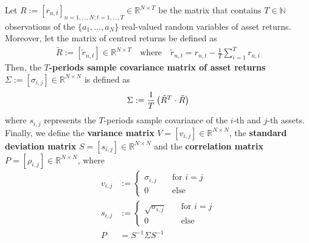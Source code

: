     \begin{definition}\label{definition:CovarianceMatrix}
           Let $R := [r_{n,t}]_{n = 1, \dots, N; t = 1, \dots, T} \in \mathbb{R}^{N \times T}$ be the matrix that contains $T \in \mathbb{N}$ observations of the $\{ a_1, \dots, a_N \}$ real-valued random variables of asset returns. Moreover, let the matrix of centred returns be defined as
           \begin{align*}
               \tilde{R} := [\tilde{r}_{n,t}] \in \mathbb{R}^{N \times T} \quad \text{where} \quad \tilde{r}_{n,t} = r_{n,t} - \frac{1}{T} \sum_{i=1}^T r_{n,i}
           \end{align*}
           Then, the \textbf{$T$-periods sample covariance matrix of asset returns} $\Sigma := [\sigma_{i,j}] \in \mathbb{R}^{N \times N}$ is defined as
           \begin{align*}
               \Sigma := \frac{1}{T} \left( \Tilde{R}^T \cdot \Tilde{R} \right)
           \end{align*}
           where $s_{i,j}$ represents the $T$-periods sample covariance of the $i$-th and $j$-th assets. Finally, we define the \textbf{variance matrix} $V = [v_{i,j}] \in \mathbb{R}^{N \times N}$, the \textbf{standard deviation matrix} $S = [s_{i,j}] \in \mathbb{R}^{N \times N}$ and the \textbf{correlation matrix} $P = [\rho_{i,j}] \in \mathbb{R}^{N \times N}$, where
           \begin{align*}
               v_{i,j} &:= \begin{cases}
                    \sigma_{i,j}            &\quad \text{for } i=j \\
                    0                       &\quad \text{else}
               \end{cases} \\
               s_{i,j} &:= \begin{cases}
                    \sqrt{\sigma_{i,j}}     &\quad \text{for } i=j \\
                    0                       &\quad \text{else}
               \end{cases} \\
               P &= S^{-1} \Sigma S^{-1}
           \end{align*}
        \end{definition}
        
